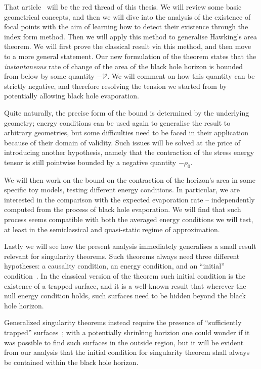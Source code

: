\documentclass[12pt, a4paper]{article}
\begin{document}
That article~\cite[]{fewster2020new} will be the red thread of this thesis. We will review some basic geometrical concepts, and then we will dive into the analysis of the existence of focal points with the aim of learning how to detect their existence through the index form method.
Then we will apply this method to generalise Hawking's area theorem. We will first prove the classical result via this method, and then move to a more general statement. Our new formulation of the theorem states that the \emph{instantaneous} rate of change of the area of the black hole horizon is bounded from below by some quantity \(-\mathcal{V}\). We will comment on how this quantity can be strictly negative, and therefore resolving the tension we started from by potentially allowing black hole evaporation.

Quite naturally, the precise form of the bound is determined by the underlying geometry; energy conditions can be used again to generalise the result to arbitrary geometries, but some difficulties need to be faced in their application because of their domain of validity. Such issues will be solved at the price of introducing another hypothesis, namely that the contraction of the stress energy tensor is still pointwise bounded by a negative quantity \(-\rho_0\).

We will then work on the bound on the contraction of the horizon's area in some specific toy models, testing different energy conditions. In particular, we are interested in the comparison with the expected evaporation rate -- independently computed from the process of black hole evaporation. We will find that such process seems compatible with both the averaged energy conditions we will test, at least in the semiclassical and quasi-static regime of approximation.

Lastly we will see how the present analysis immediately generalises a small result relevant for singularity theorems. Such theorems always need three different hypotheses: a causality condition, an energy condition, and an ``initial'' condition~\cite[]{senovilla1998singularity}. In the classical version of the theorem such initial condition is the existence of a trapped surface, and it is a well-known result that wherever the null energy condition holds, such surfaces need to be hidden beyond the black hole horizon. 

Generalized singularity theorems instead require the presence of ``sufficiently trapped'' surfaces~\cite[]{fewster2020new}; with a potentially shrinking horizion one could wonder if it was possible to find such surfaces in the outside region, but it will be evident from our analysis that the initial condition for singularity theorem shall always be contained within the black hole horizon.

\printbibliography[heading=bibintoc]
\end{document}
